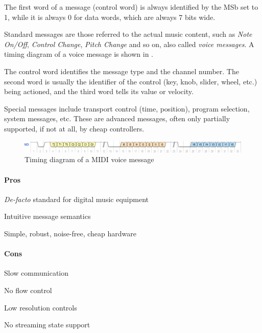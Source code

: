 \documentclass[a4paper,10pt]{article}
\begin{document}
\begin{multicols}{2}
The first word of a message (control word) is always identified by the MSb
set to 1, while it is always 0 for data words, which are always 7 bits wide.

Standard messages are those referred to the actual music content, such as
\emph{Note On/Off}, \emph{Control Change}, \emph{Pitch Change} and so on,
also called \emph{voice messages}. A timing diagram of a voice message is
shown in .

The control word identifies the message type and the channel number. The
second word is usually the identifier of the control (key, knob, slider,
wheel, etc.) being actioned, and the third word tells its value or velocity.

Special messages include transport control (time, position), program selection,
system messages, etc. These are advanced messages, often only partially
supported, if not at all, by cheap controllers.

\begin{figure}[t]
	\centering
	\includegraphics[keepaspectratio=true,width=\textwidth]{images/midi_voice_msg.pdf}
	\caption{Timing diagram of a MIDI voice message}
	\label{fig:midi_voice_msg}
\end{figure}


\paragraph{Pros}
\begin{itemize*}
	\item \emph{De-facto} standard for digital music equipment
	\item Intuitive message semantics
	\item Simple, robust, noise-free, cheap hardware
\end{itemize*}


\paragraph{Cons}
\begin{itemize*}
	\item Slow communication
	\item No flow control
	\item Low resolution controls
	\item No streaming state support
\end{itemize*}



\end{multicols}
\end{document}
